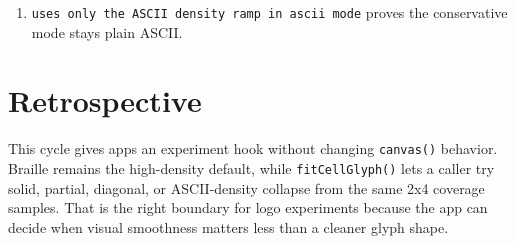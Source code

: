 \begin{enumerate}
\item
  \texttt{u\allowbreak{}s\allowbreak{}e\allowbreak{}s\allowbreak{} \allowbreak{}o\allowbreak{}n\allowbreak{}l\allowbreak{}y\allowbreak{} \allowbreak{}t\allowbreak{}h\allowbreak{}e\allowbreak{} \allowbreak{}A\allowbreak{}S\allowbreak{}C\allowbreak{}I\allowbreak{}I\allowbreak{} \allowbreak{}d\allowbreak{}e\allowbreak{}n\allowbreak{}s\allowbreak{}i\allowbreak{}t\allowbreak{}y\allowbreak{} \allowbreak{}r\allowbreak{}a\allowbreak{}m\allowbreak{}p\allowbreak{} \allowbreak{}i\allowbreak{}n\allowbreak{} \allowbreak{}a\allowbreak{}s\allowbreak{}c\allowbreak{}i\allowbreak{}i\allowbreak{} \allowbreak{}m\allowbreak{}o\allowbreak{}d\allowbreak{}e} proves the conservative mode stays plain ASCII.
\end{enumerate}

\section{Retrospective}\label{record-160-retrospective}

This cycle gives apps an experiment hook without changing \texttt{c\allowbreak{}a\allowbreak{}n\allowbreak{}v\allowbreak{}a\allowbreak{}s\allowbreak{}(\allowbreak{})} behavior. Braille remains the high-density default, while \texttt{f\allowbreak{}i\allowbreak{}t\allowbreak{}C\allowbreak{}e\allowbreak{}l\allowbreak{}l\allowbreak{}G\allowbreak{}l\allowbreak{}y\allowbreak{}p\allowbreak{}h\allowbreak{}(\allowbreak{})} lets a caller try solid, partial, diagonal, or ASCII-density collapse from the same 2x4 coverage samples. That is the right boundary for logo experiments because the app can decide when visual smoothness matters less than a cleaner glyph shape.

